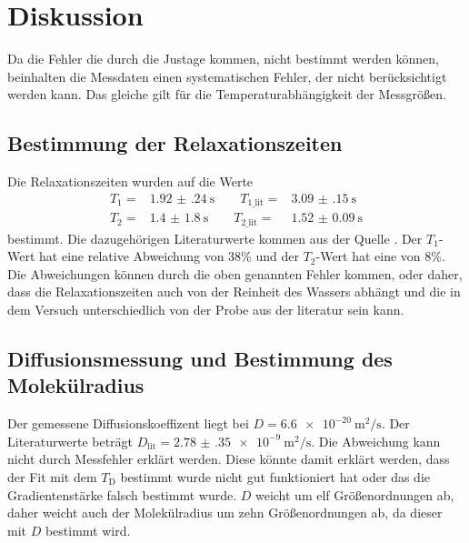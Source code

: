 \section{Diskussion}
\label{sec:Diskussion}
Da die Fehler die durch die Justage kommen, nicht bestimmt werden können, beinhalten die Messdaten 
einen systematischen Fehler, der nicht berücksichtigt werden kann. Das gleiche gilt für die Temperaturabhängigkeit 
der Messgrößen.
\subsection{Bestimmung der Relaxationszeiten}
Die Relaxationszeiten wurden auf die Werte 
\begin{align}
    T_{\text{1}}=& \SI{1.92(24)}{\second} \qquad T_{\text{1\_lit}}=& \SI{3.09(15)}{\second}\\
    T_{\text{2}}=& \SI{1.4(18)}{\second} \qquad T_{\text{2\_lit}}=& \SI{1.52(9)}{\second}
\end{align}
bestimmt.
Die dazugehörigen Literaturwerte kommen aus der Quelle \cite{Quelle8}. Der $T_{\text{1}}$-Wert hat eine relative Abweichung 
von 38\% und der $T_{\text{2}}$-Wert hat eine von 8\%. Die Abweichungen können durch die oben genannten Fehler kommen, oder 
daher, dass die Relaxationszeiten auch von der Reinheit des Wassers abhängt und die in dem Versuch unterschiedlich von der 
Probe aus der literatur sein kann.
\subsection{Diffusionsmessung und Bestimmung des Molekülradius}
Der gemessene Diffusionskoeffizent liegt bei $D=\SI{6.6e-20}{\square\meter\per\second}$. Der Literaturwerte beträgt 
$D_{\text{lit}}= \SI{2.78(35)e-9}{\square\meter\per\second}$. Die Abweichung kann nicht durch Messfehler erklärt werden.
Diese könnte damit erklärt werden, dass der Fit mit dem $T_{\text{D}}$ bestimmt wurde nicht gut funktioniert hat oder 
das die Gradientenstärke falsch bestimmt wurde.
$D$ weicht um elf Größenordnungen ab, daher weicht auch der Molekülradius um zehn Größenordnungen ab, da dieser 
mit $D$ bestimmt wird.